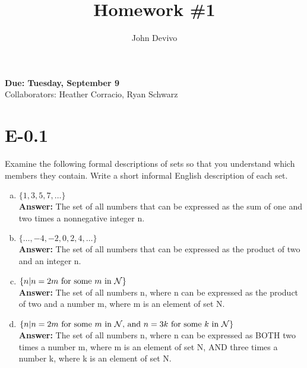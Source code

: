 \documentclass{article}
\author{John Devivo}          %
\title{Homework \#1}       %
\begin{document}
\maketitle
\begin{center}     %
\Large{\bf Due: Tuesday, September 9}\\
Collaborators: Heather Corracio, Ryan Schwarz
\end{center}       %

\section*{E-0.1}    %
Examine the following formal descriptions of sets so that you understand which
members they contain.
Write a short informal English description of each set.
\begin{enumerate}[a.]
\item $\{1, 3, 5, 7, \dots \}$\\
{\bf Answer: } The set of all numbers that can be expressed as the sum of one and two times a nonnegative integer n.

\item $\{\dots, -4, -2, 0, 2, 4, \dots \}$\\
{\bf Answer: } The set of all numbers that can be expressed as the product of two and an integer n.

\item $\{n | n = 2m \mbox{\ for some $m$ in $\cal{N}$}\}$\\
{\bf Answer: } The set of all numbers n, where n can be expressed as the product of two and a number m, where m is an element of set N.

\item $\{n | n = 2m \mbox{\ for some $m$ in $\cal{N}$, and $n = 3k$ for some $k$ in $\cal{N}$}\}$\\
{\bf Answer: } The set of all numbers n, where n can be expressed as BOTH two times a number m, where m is an element of set N, AND three times a number k, where k is an element of set N.

\end{enumerate}
\end{document}
